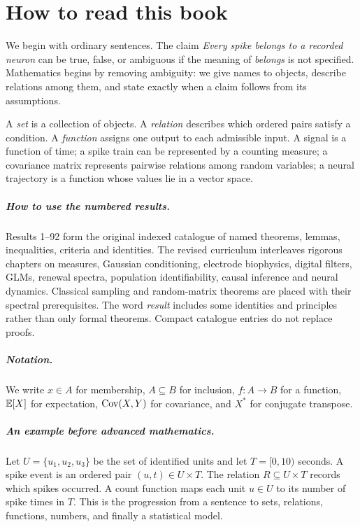 \chapter*{How to read this book}
We begin with ordinary sentences. The claim \emph{Every spike belongs to a
recorded neuron} can be true, false, or ambiguous if the meaning of
\emph{belongs} is not specified. Mathematics begins by removing ambiguity:
we give names to objects, describe relations among them, and state
exactly when a claim follows from its assumptions.

A \emph{set} is a collection of objects. A \emph{relation} describes
which ordered pairs satisfy a condition. A \emph{function} assigns one output
to each admissible input. A signal is a function of time; a spike train can
be represented by a counting measure; a covariance matrix represents
pairwise relations among random variables; a neural trajectory is a
function whose values lie in a vector space.

\paragraph{How to use the numbered results.}
Results 1--92 form the original indexed catalogue of named theorems,
lemmas, inequalities, criteria and identities. The revised curriculum
interleaves rigorous chapters on measures, Gaussian conditioning,
electrode biophysics, digital filters, GLMs, renewal spectra, population
identifiability, causal inference and neural dynamics. Classical sampling
and random-matrix theorems are placed with their spectral prerequisites.
The word \emph{result} includes some identities and principles rather than
only formal theorems. Compact catalogue entries do not replace proofs.

\paragraph{Notation.} We write $x\in A$ for membership, $A\subseteq B$
for inclusion, $f:A\to B$ for a function, $\mathbb{E}[X]$ for expectation,
$\operatorname{Cov}(X,Y)$ for covariance, and $X^*$ for conjugate transpose.

\paragraph{An example before advanced mathematics.}
Let $U=\{u_1,u_2,u_3\}$ be the set of identified units and let
$T=[0,10)$ seconds. A spike event is an ordered pair
$(u,t)\in U\times T$. The relation $R\subseteq U\times T$
records which spikes occurred. A count function maps each unit
$u\in U$ to its number of spike times in $T$.
This is the progression from a sentence to sets, relations, functions,
numbers, and finally a statistical model.

